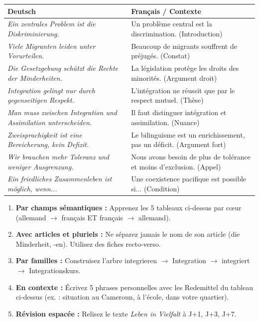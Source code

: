 \documentclass[11pt]{article}
\newcommand{\cle}[1]{{\popxbold\color{popdark}#1}}
\newcommand{\all}[1]{\ifmmode\text{\textit{#1}}\else\begingroup\selectlanguage{ngerman}\itshape #1\endgroup\fi}
\begin{document}
\begin{center}
\begin{tabularx}{\linewidth}{|X|X|}
\hline
\rowcolor{popmuted}
\textbf{Deutsch} & \textbf{Français / Contexte} \\
\hline
\all{Ein zentrales Problem ist die Diskriminierung.} & Un problème central est la discrimination. (Introduction) \\
\all{Viele Migranten leiden unter Vorurteilen.} & Beaucoup de migrants souffrent de préjugés. (Constat) \\
\all{Die Gesetzgebung schützt die Rechte der Minderheiten.} & La législation protège les droits des minorités. (Argument droit) \\
\all{Integration gelingt nur durch gegenseitigen Respekt.} & L'intégration ne réussit que par le respect mutuel. (Thèse) \\
\all{Man muss zwischen Integration und Assimilation unterscheiden.} & Il faut distinguer intégration et assimilation. (Nuance) \\
\all{Zweisprachigkeit ist eine Bereicherung, kein Defizit.} & Le bilinguisme est un enrichissement, pas un déficit. (Argument fort) \\
\all{Wir brauchen mehr Toleranz und weniger Ausgrenzung.} & Nous avons besoin de plus de tolérance et moins d'exclusion. (Appel) \\
\all{Ein friedliches Zusammenleben ist möglich, wenn...} & Une coexistence pacifique est possible si... (Condition) \\
\hline
\end{tabularx}
\end{center}

\begin{methode}
\begin{enumerate}
    \item \textbf{Par champs sémantiques :} Apprenez les 5 tableaux ci-dessus par cœur (allemand $\rightarrow$ français ET français $\rightarrow$ allemand).
    \item \textbf{Avec articles et pluriels :} Ne séparez jamais le nom de son article (\cle{die Minderheit, -en}). Utilisez des fiches recto-verso.
    \item \textbf{Par familles :} Construisez l'arbre \cle{integrieren $\rightarrow$ Integration $\rightarrow$ integriert $\rightarrow$ Integrationskurs}.
    \item \textbf{En contexte :} Écrivez 5 phrases personnelles avec les \cle{Redemittel} du tableau ci-dessus (ex. : situation au Cameroun, à l'école, dans votre quartier).
    \item \textbf{Révision espacée :} Relisez le texte \emph{Leben in Vielfalt} à J+1, J+3, J+7.
\end{enumerate}
\end{methode}
\end{document}
